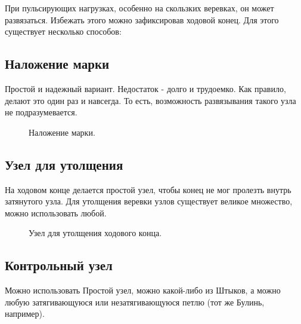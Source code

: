 При пульсирующих нагрузках, особенно на скользких веревках, он может развязаться. Избежать этого можно зафиксировав ходовой конец. Для этого существует несколько способов:

\subsection*{Наложение марки}

Простой и надежный вариант. Недостаток - долго и трудоемко. Как правило, делают это один раз и навсегда. То есть, возможность развязывания такого узла не подразумевается.

\begin{figure}[H]\centering
	\begin{minipage}{1\linewidth}
		\begin{center}
			\tcbox[enhanced jigsaw,colframe=black,opacityframe=0.5,opacityback=0.5]
			{\centering{}}
		\end{center}
	\end{minipage}
\caption{Наложение марки.}
\label{ris:Besedochny_marka}
\end{figure}

\subsection*{Узел для утолщения}

На ходовом конце делается простой узел, чтобы конец не мог пролезть внутрь затянутого узла. Для утолщения веревки узлов существует великое множество, можно использовать любой.

\begin{figure}[H]\centering
	\begin{minipage}{1\linewidth}
		\begin{center}
			\tcbox[enhanced jigsaw,colframe=black,opacityframe=0.5,opacityback=0.5]
			{\centering{}}
		\end{center}
	\end{minipage}
\caption{Узел для утолщения ходового конца.}
\label{ris:Besedochny_utolsh}
\end{figure}

\subsection*{Контрольный узел}

Можно использовать Простой узел, можно какой-либо из Штыков, а можно любую затягивающуюся или незатягивающуюся петлю (тот же Булинь, например).

